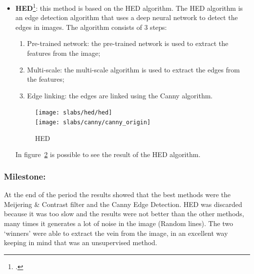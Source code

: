 \begin{itemize}
    It's based on the Hessian matrix, that is a square matrix containing the second order partial derivatives of a function.
    The Hessian matrix is used to calculate the eigenvalues and eigenvectors of the image.
    The eigenvalues are used to calculate the line-like structures of the image.
    The contrast filter is used to enhance the contrast of the image.
    \begin{figure}[H]
        \centering
        \texttt{[image: slabs/meijering/meije]}
        \\
        \texttt{[image: slabs/canny/canny\_origin]}
        \caption{Meijering \& Contrast filter}\label{fig:meij_compare}
    \end{figure}
    In figure~\ref*{fig:meij_compare} is possible to see the result of the Meijering \& Contrast filter.
    \item \textbf{HED}\footcite{paper:hed}: this method is based on the HED algorithm.
    The HED algorithm is an edge detection algorithm that uses a deep neural network to detect the edges in images.
    The algorithm consists of 3 steps:
    \begin{enumerate}
        \item Pre-trained network: the pre-trained network is used to extract the features from the image;
        \item Multi-scale: the multi-scale algorithm is used to extract the edges from the features;
        \item Edge linking: the edges are linked using the Canny algorithm.
    \end{enumerate}
    \begin{figure}[H]
        \centering
        \texttt{[image: slabs/hed/hed]}
        \\
        \texttt{[image: slabs/canny/canny\_origin]}
        \caption{HED}\label{fig:hed_compare}
    \end{figure}
    In figure~\ref*{fig:hed_compare} is possible to see the result of the HED algorithm.
\end{itemize}
\subsubsection{Milestone:}
At the end of the period the results showed that the best methods were the Meijering \& Contrast filter and the Canny Edge Detection.
HED was discarded because it was too slow and the results were not better than the other methods, many times it generates a lot of noise in the image (Random lines).
The two `winners' were able to extract the vein from the image, in an excellent way keeping in mind that was an unsupervised method.
